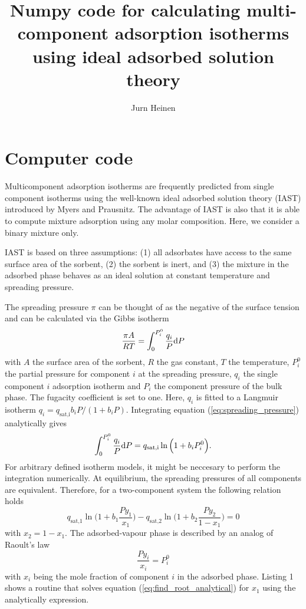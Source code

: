 \documentclass{article}
\begin{document}
\title{Numpy code for calculating multi-component adsorption isotherms using ideal adsorbed solution theory}
\author{Jurn Heinen}

\maketitle

\section{Computer code}

Multicomponent adsorption isotherms are frequently predicted from single component isotherms using the well-known ideal adsorbed solution theory (IAST) introduced by Myers and Prausnitz.\cite{Myers1965} The advantage of IAST is also that it is able to compute mixture adsorption using any molar composition. Here, we consider a binary mixture only.

IAST is based on three assumptions: (1) all adsorbates have access to the same surface area of the sorbent, (2) the sorbent is inert, and (3) the mixture in the adsorbed phase behaves as an ideal solution at constant temperature and spreading pressure.

The spreading pressure $\pi$ can be thought of as the negative of the surface tension and can be calculated via the Gibbs isotherm\cite{Myers1965}
%
\begin{equation}
        \frac{{\pi}A}{RT} = \int_0^{P_i^0}\frac{q_i}{P} {\dif P}
	\label{eq:spreading_pressure}
\end{equation}
%
with $A$ the surface area of the sorbent, $R$ the gas constant, $T$ the temperature, $P_i^0$ the partial pressure for component $i$ at the spreading pressure, $q_i$ the single component $i$ adsorption isotherm and $P_i$ the component pressure of the bulk phase. The fugacity coefficient is set to one. Here, $q_i$ is fitted to a Langmuir isotherm $q_i = q_\text{sat,i}b_iP/(1+b_iP)$. Integrating equation (\ref{eq:spreading_pressure}) analytically gives
%
\begin{equation}
	\int_0^{P_i^0}\frac{q_i}{P} {\dif P} =  q_\text{sat,i}\ln\Big({1+b_iP_i^0}\Big). 
	\label{eq:langmuir_analytical}
\end{equation}
%
For arbitrary defined isotherm models, it might be neccesary to perform the integration numerically. At equilibrium, the spreading pressures of all components are equivalent. Therefore, for a two-component system the following relation holds 
%
\begin{equation} 
	q_\text{sat,1}\ln{\Big(1+b_1\frac{Py_1}{x_1}\Big)} - q_\text{sat,2}\ln{\Big(1+b_2\frac{Py_2}{1-x_1}\Big)} = 0
	\label{eq:find_root_analytical}
\end{equation} 
%
with $x_2 = 1 - x_1$. The adsorbed-vapour phase is described by an analog of Raoult's law 
%
\begin{equation}
        \frac{Py_i}{x_i} = P_i^0
\end{equation}
%
with $x_i$ being the mole fraction of component $i$ in the adsorbed phase. Listing 1 shows a routine that solves equation (\ref{eq:find_root_analytical}) for $x_1$ using the analytically expression.
\end{document}
